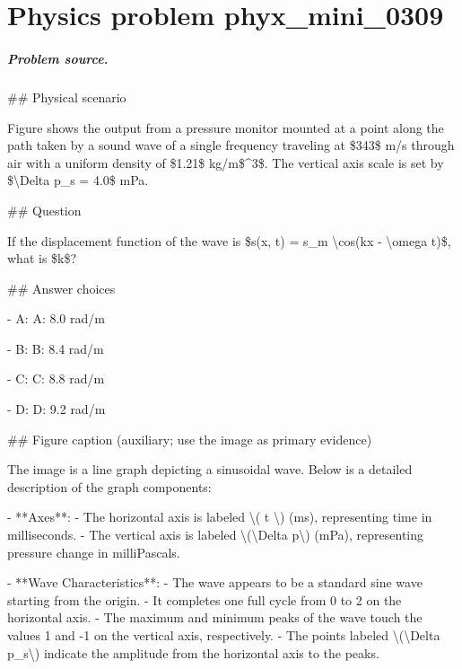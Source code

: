 
\chapter{Physics problem phyx\_mini\_0309}
\label{ch:PhyXMiniProblems_problem_phyx_mini_0309}

\paragraph{Problem source.}
\#\# Physical scenario

Figure shows the output from a pressure monitor mounted at a point along the path taken by a sound wave of a single frequency traveling at \$343\$ m/s through air with a uniform density of \$1.21\$ kg/m\$\textasciicircum{}3\$. The vertical axis scale is set by \$\textbackslash{}Delta p\_s = 4.0\$ mPa.

\#\# Question

If the displacement function of the wave is \$s(x, t) = s\_m \textbackslash{}cos(kx - \textbackslash{}omega t)\$, what is \$k\$?

\#\# Answer choices

- A: A: 8.0 rad/m

- B: B: 8.4 rad/m

- C: C: 8.8 rad/m

- D: D: 9.2 rad/m

\#\# Figure caption (auxiliary; use the image as primary evidence)

The image is a line graph depicting a sinusoidal wave. Below is a detailed description of the graph components:

- **Axes**: 
  - The horizontal axis is labeled \textbackslash{}( t \textbackslash{}) (ms), representing time in milliseconds.
  - The vertical axis is labeled \textbackslash{}(\textbackslash{}Delta p\textbackslash{}) (mPa), representing pressure change in milliPascals.

- **Wave Characteristics**:
  - The wave appears to be a standard sine wave starting from the origin.
  - It completes one full cycle from 0 to 2 on the horizontal axis.
  - The maximum and minimum peaks of the wave touch the values 1 and -1 on the vertical axis, respectively.
  - The points labeled \textbackslash{}(\textbackslash{}Delta p\_s\textbackslash{}) indicate the amplitude from the horizontal axis to the peaks.


